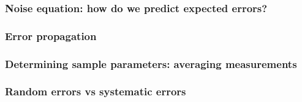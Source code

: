 \documentclass[12pt]{article}
\begin{document}
\subsubsection*{Noise equation: how do we predict expected errors?}
\subsubsection*{Error propagation}
\subsubsection*{Determining sample parameters: averaging measurements}
\subsubsection*{Random errors vs systematic errors}
\end{document}
